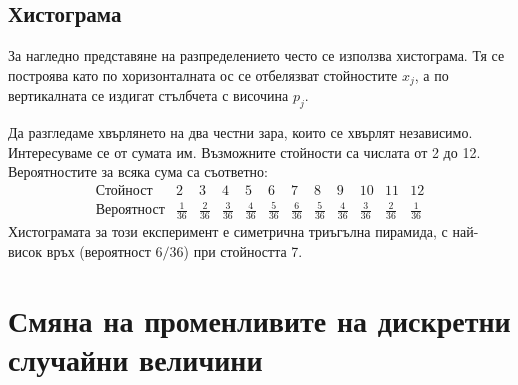 \subsection{Хистограма}
За нагледно представяне на разпределението често се използва хистограма. Тя се построява като по хоризонталната ос се отбелязват стойностите $x_j$, а по вертикалната се издигат стълбчета с височина $p_j$.

\begin{example}\label{ex:04-3}
Да разгледаме хвърлянето на два честни зара, които се хвърлят независимо. Интересуваме се от сумата им. Възможните стойности са числата от 2 до 12. Вероятностите за всяка сума са съответно:
\[
\begin{array}{c|c|c|c|c|c|c|c|c|c|c|c}
\text{Стойност} & 2 & 3 & 4 & 5 & 6 & 7 & 8 & 9 & 10 & 11 & 12 \\
\hline
\text{Вероятност} & \frac{1}{36} & \frac{2}{36} & \frac{3}{36} & \frac{4}{36} & \frac{5}{36} & \frac{6}{36} & \frac{5}{36} & \frac{4}{36} & \frac{3}{36} & \frac{2}{36} & \frac{1}{36}
\end{array}
\]
Хистограмата за този експеримент е симетрична триъгълна пирамида, с най-висок връх
(вероятност $6/36$) при стойността 7.

\begin{lecfigure}[Хистограма на сумата от два честни зара. Височината на всяка
колонка е $\mathbb{P}(X = x)$; сборът на всички височини е $1$. Симетрията спрямо
$x = 7$ отразява симетрията на самия експеримент.\label{fig:dice-hist}]
\end{lecfigure}

\end{example}

\section{Смяна на променливите на дискретни случайни величини}

